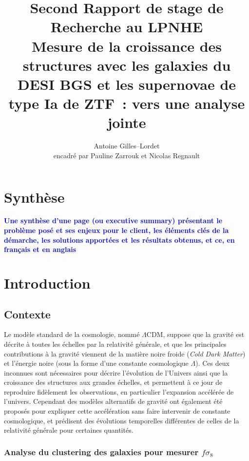 \documentclass{book}
\title{Second Rapport de stage de Recherche au LPNHE\\\vspace{.3em} \large Mesure de la croissance des structures avec les galaxies du DESI BGS et les supernovae de type Ia de ZTF~: vers une analyse jointe}
\author{Antoine Gilles--Lordet\\ \vspace{.1em} \small encadré par Pauline Zarrouk et Nicolas Regnault }
\date{}
\newcommand{\consignes}[1]{{\textcolor{blue}{\bf \large #1}}}
\begin{document}
\maketitle

\tableofcontents

\chapter{Synthèse}

\consignes{Une synthèse d’une page (ou executive summary) présentant le problème posé et ses enjeux pour le client, les éléments clés de la démarche, les solutions apportées et les résultats obtenus, et ce, en français et en anglais}

\chapter{Introduction}

\section{Contexte}

Le modèle standard de la cosmologie, nommé $\Lambda$CDM, suppose que la gravité est décrite à toutes les échelles par la relativité générale, et que les principales contributions à la gravité viennent de la matière noire froide (\textit{Cold Dark Matter}) et l'énergie noire (sous la forme d'une constante cosmologique $\Lambda$). Ces deux inconnues sont nécessaires pour décrire l'évolution de l'Univers ainsi que la croissance des structures aux grandes échelles, et permettent à ce jour de reproduire fidèlement les observations, en particulier l'expansion accélérée de l'univers. Cependant des modèles alternatifs de gravité ont également été proposés pour expliquer cette accélération sans faire intervenir de constante cosmologique, et prédisent des évolutions temporelles différentes de celles de la relativité générale pour certaines quantités.

\subsection{Analyse du clustering des galaxies pour mesurer $f\sigma_8$}
\end{document}
